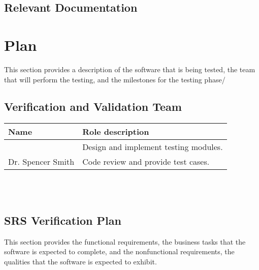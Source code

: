 \documentclass[12pt, titlepage]{article}
\begin{document}
\subsection{Relevant Documentation}


\citet{MG}
\citet{SRS}


\section{Plan}
This section provides a description of the software that is being tested, the team that will
perform the testing, and the milestones for the testing phase/

\subsection{Verification and Validation Team}

\renewcommand{\arraystretch}{1.2}
\begin{tabular}{l l} 
  \toprule		
  \textbf{Name} & \textbf{Role description}\\
  \midrule 
  \authname{} & Design and implement testing modules.\\
  Dr. Spencer Smith & Code review and provide test cases.\\
  \bottomrule
\end{tabular}\\ \\


\subsection{SRS Verification Plan}

This section provides the functional requirements, the business tasks that the software is
expected to complete, and the nonfunctional requirements, the qualities that the software is
expected to exhibit.
\end{document}
